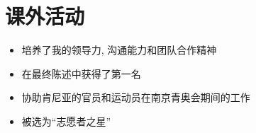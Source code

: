 \section{课外活动}
\begin{itemize}
  \item 培养了我的领导力, 沟通能力和团队合作精神
  \item 在最终陈述中获得了第一名
\end{itemize}

\begin{itemize}
  \item 协助肯尼亚的官员和运动员在南京青奥会期间的工作
  \item 被选为``志愿者之星''
\end{itemize}